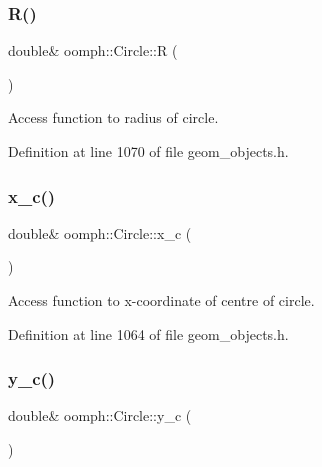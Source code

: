 \subsubsection{\texorpdfstring{R()}{R()}}
{\footnotesize\ttfamily double\& oomph\+::\+Circle\+::R (\begin{DoxyParamCaption}{ }\end{DoxyParamCaption})\hspace{0.3cm}{\ttfamily [inline]}}



Access function to radius of circle. 



Definition at line 1070 of file geom\+\_\+objects.\+h.

\mbox{\label{classoomph_1_1Circle_a8245cf2cbeb6ff6bf5a11fa9ac56660b}} 
\subsubsection{\texorpdfstring{x\+\_\+c()}{x\_c()}}
{\footnotesize\ttfamily double\& oomph\+::\+Circle\+::x\+\_\+c (\begin{DoxyParamCaption}{ }\end{DoxyParamCaption})\hspace{0.3cm}{\ttfamily [inline]}}



Access function to x-\/coordinate of centre of circle. 



Definition at line 1064 of file geom\+\_\+objects.\+h.

\mbox{\label{classoomph_1_1Circle_a0a08b85aa06f6b4312f40f143a11a70b}} 
\subsubsection{\texorpdfstring{y\+\_\+c()}{y\_c()}}
{\footnotesize\ttfamily double\& oomph\+::\+Circle\+::y\+\_\+c (\begin{DoxyParamCaption}{ }\end{DoxyParamCaption})\hspace{0.3cm}{\ttfamily [inline]}}



